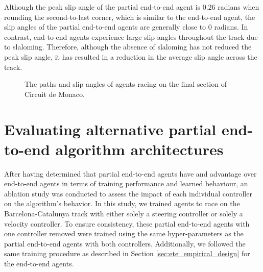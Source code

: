 Although the peak slip angle of the partial end-to-end agent is $0.26$ radians when rounding the second-to-last corner, which is similar to the end-to-end agent, the slip angles of the partial end-to-end agents are generally close to $0$ radians. 
In contrast, end-to-end agents experience large slip angles throughout the track due to slaloming.
Therefore, although the absence of slaloming has not reduced the peak slip angle, it has resulted in a reduction in the average slip angle across the track.

\begin{figure}[htb!]
    \centering
    
    \caption[Paths and slip angles of agents racing on Circuit de Monaco]{The paths and slip angles of agents racing on the final section of Circuit de Monaco.}
    \label{fig:pete:slip}
\end{figure}







\section{Evaluating alternative partial end-to-end algorithm architectures}

After having determined that partial end-to-end agents have and advantage over end-to-end agents in terms of training performance and learned behaviour, an ablation study was conducted to assess the impact of each individual controller on the algorithm's behavior. 
In this study, we trained agents to race on the Barcelona-Catalunya track with either solely a steering controller or solely a velocity controller.
To ensure consistency, these partial end-to-end agents with one controller removed were trained using the same hyper-parameters as the partial end-to-end agents with both controllers. 
Additionally, we followed the same training procedure as described in Section \ref{sec:ete_empirical_design} for the end-to-end agents.


